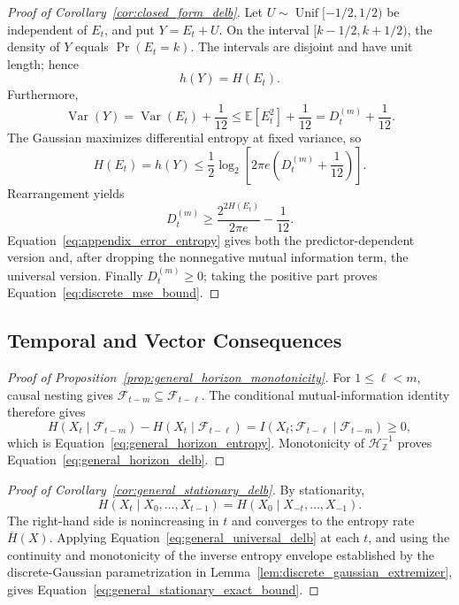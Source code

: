 \begin{proof}[Proof of Corollary~\ref{cor:closed_form_delb}]
Let \(U\sim\operatorname{Unif}[-1/2,1/2)\) be independent of \(E_t\), and
put \(Y=E_t+U\). On the interval
\([k-1/2,k+1/2)\), the density of \(Y\) equals
\(\Pr(E_t=k)\). The intervals are disjoint and have unit length; hence
\begin{equation}
h(Y)=H(E_t).
\label{eq:dither_entropy_identity}
\end{equation}
Furthermore,
\begin{equation}
\operatorname{Var}(Y)
=
\operatorname{Var}(E_t)+\frac{1}{12}
\leq
\mathbb{E}[E_t^2]+\frac{1}{12}
=
D_t^{(m)}+\frac{1}{12}.
\label{eq:dither_variance}
\end{equation}
The Gaussian maximizes differential entropy at fixed variance, so
\begin{equation}
H(E_t)
=h(Y)
\leq
\frac{1}{2}\log_2\!\left[
2\pi e\left(D_t^{(m)}+\frac{1}{12}\right)
\right].
\label{eq:dither_gaussian_bound}
\end{equation}
Rearrangement yields
\[
D_t^{(m)}
\geq
\frac{2^{2H(E_t)}}{2\pi e}-\frac{1}{12}.
\]
Equation~\eqref{eq:appendix_error_entropy} gives both the
predictor-dependent version and, after dropping the nonnegative mutual
information term, the universal version. Finally \(D_t^{(m)}\geq0\);
taking the positive part proves Equation~\eqref{eq:discrete_mse_bound}.
\end{proof}

\subsection{Temporal and Vector Consequences}

\begin{proof}[Proof of Proposition~\ref{prop:general_horizon_monotonicity}]
For \(1\leq\ell<m\), causal nesting gives
\(\mathcal{F}_{t-m}\subseteq\mathcal{F}_{t-\ell}\). The conditional
mutual-information identity therefore gives
\[
H(X_t\mid\mathcal{F}_{t-m})
-
H(X_t\mid\mathcal{F}_{t-\ell})
=
I(X_t;\mathcal{F}_{t-\ell}\mid\mathcal{F}_{t-m})
\geq0,
\]
which is Equation~\eqref{eq:general_horizon_entropy}. Monotonicity of
\(\mathcal{H}_{\mathbb{Z}}^{-1}\) proves
Equation~\eqref{eq:general_horizon_delb}.
\end{proof}

\begin{proof}[Proof of Corollary~\ref{cor:general_stationary_delb}]
By stationarity,
\[
H(X_t\mid X_0,\ldots,X_{t-1})
=
H(X_0\mid X_{-t},\ldots,X_{-1}).
\]
The right-hand side is nonincreasing in \(t\) and converges to the entropy
rate \(\overline{H}(X)\). Applying
Equation~\eqref{eq:general_universal_delb} at each \(t\), and using the
continuity and monotonicity of the inverse entropy envelope established by
the discrete-Gaussian parametrization in
Lemma~\ref{lem:discrete_gaussian_extremizer}, gives
Equation~\eqref{eq:general_stationary_exact_bound}.
\end{proof}

